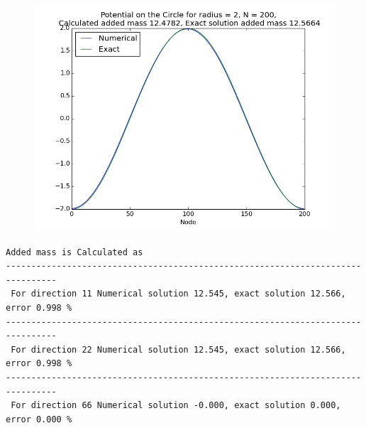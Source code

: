\documentclass[a4paper,norsk]{article}
\begin{document}
\begin{figure}[h!]	
	\centering
	\includegraphics[scale=0.6]{present1.png}
\end{figure}

\newpage
\begin{lstlisting}[style=terminal]
Added mass is Calculated as
--------------------------------------------------------------------------------
 For direction 11 Numerical solution 12.545, exact solution 12.566, error 0.998 %
--------------------------------------------------------------------------------
 For direction 22 Numerical solution 12.545, exact solution 12.566, error 0.998 %
--------------------------------------------------------------------------------
 For direction 66 Numerical solution -0.000, exact solution 0.000, error 0.000 %
\end{lstlisting}
\end{document}
